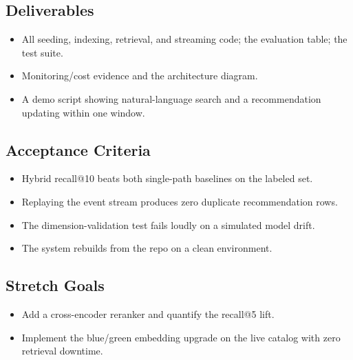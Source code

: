 \subsection*{Deliverables}
\begin{itemize}
    \item All seeding, indexing, retrieval, and streaming code; the evaluation table; the test suite.
    \item Monitoring/cost evidence and the architecture diagram.
    \item A demo script showing natural-language search and a recommendation updating within one window.
\end{itemize}

\subsection*{Acceptance Criteria}
\begin{itemize}
    \item Hybrid recall@10 beats both single-path baselines on the labeled set.
    \item Replaying the event stream produces zero duplicate recommendation rows.
    \item The dimension-validation test fails loudly on a simulated model drift.
    \item The system rebuilds from the repo on a clean environment.
\end{itemize}

\subsection*{Stretch Goals}
\begin{itemize}
    \item Add a cross-encoder reranker and quantify the recall@5 lift.
    \item Implement the blue/green embedding upgrade on the live catalog with zero retrieval downtime.
\end{itemize}